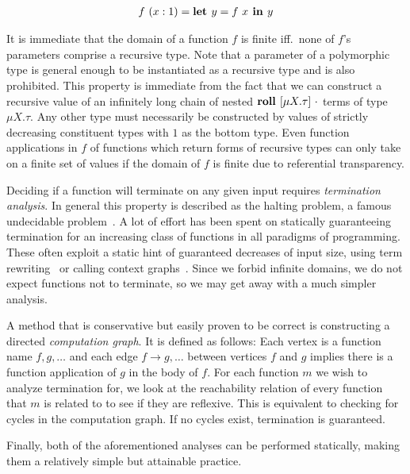 \begin{align*}
  f~(x:1) = \textbf{let } y = f~x \textbf{ in } y
\end{align*}

It is immediate that the domain of a function $f$ is finite iff.~none of $f$'s
parameters comprise a recursive type. Note that a parameter of a polymorphic
type is general enough to be instantiated as a recursive type and is also
prohibited. This property is immediate from the fact that we can construct a
recursive value of an infinitely long chain of nested $\textbf{roll } [\mu X .
\tau]\ \cdot$ terms of type $\mu X . \tau$. Any other type must necessarily be
constructed by values of strictly decreasing constituent types with $1$ as the
bottom type. Even function applications in $f$ of functions which return forms
of recursive types can only take on a finite set of values if the domain of $f$
is finite due to referential transparency.

Deciding if a function will terminate on any given input requires
\emph{termination analysis}. In general this property is described as the
halting problem, a famous undecidable problem~\cite{Turing:1937}. A lot of
effort has been spent on statically guaranteeing termination for an increasing
class of functions in all paradigms of programming. These often exploit a
static hint of guaranteed decreases of input size, using term
rewriting~\cite{Giesl:2006} or calling context graphs~\cite{Manolios:2006}.
Since we forbid infinite domains, we do not expect functions not to terminate,
so we may get away with a much simpler analysis.

A method that is conservative but easily proven to be correct is constructing a
directed \emph{computation graph}. It is defined as follows: Each vertex is a
function name $f,g, \dots$ and each edge $f \rightarrow g, \dots$ between
vertices $f$ and $g$ implies there is a function application of $g$ in the body
of $f$. For each function $m$ we wish to analyze termination for, we look at
the reachability relation of every function that $m$ is related to to see if
they are reflexive. This is equivalent to checking for cycles in the
computation graph. If no cycles exist, termination is guaranteed.

Finally, both of the aforementioned analyses can be performed statically,
making them a relatively simple but attainable practice.

